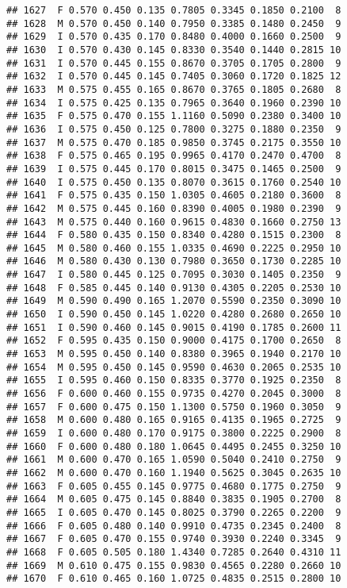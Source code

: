 \documentclass[
]{article}
\begin{document}
\begin{verbatim}
## 1627  F 0.570 0.450 0.135 0.7805 0.3345 0.1850 0.2100  8
## 1628  M 0.570 0.450 0.140 0.7950 0.3385 0.1480 0.2450  9
## 1629  I 0.570 0.435 0.170 0.8480 0.4000 0.1660 0.2500  9
## 1630  I 0.570 0.430 0.145 0.8330 0.3540 0.1440 0.2815 10
## 1631  I 0.570 0.445 0.155 0.8670 0.3705 0.1705 0.2800  9
## 1632  I 0.570 0.445 0.145 0.7405 0.3060 0.1720 0.1825 12
## 1633  M 0.575 0.455 0.165 0.8670 0.3765 0.1805 0.2680  8
## 1634  I 0.575 0.425 0.135 0.7965 0.3640 0.1960 0.2390 10
## 1635  F 0.575 0.470 0.155 1.1160 0.5090 0.2380 0.3400 10
## 1636  I 0.575 0.450 0.125 0.7800 0.3275 0.1880 0.2350  9
## 1637  M 0.575 0.470 0.185 0.9850 0.3745 0.2175 0.3550 10
## 1638  F 0.575 0.465 0.195 0.9965 0.4170 0.2470 0.4700  8
## 1639  I 0.575 0.445 0.170 0.8015 0.3475 0.1465 0.2500  9
## 1640  I 0.575 0.450 0.135 0.8070 0.3615 0.1760 0.2540 10
## 1641  F 0.575 0.435 0.150 1.0305 0.4605 0.2180 0.3600  8
## 1642  M 0.575 0.445 0.160 0.8390 0.4005 0.1980 0.2390  9
## 1643  M 0.575 0.440 0.160 0.9615 0.4830 0.1660 0.2750 13
## 1644  F 0.580 0.435 0.150 0.8340 0.4280 0.1515 0.2300  8
## 1645  M 0.580 0.460 0.155 1.0335 0.4690 0.2225 0.2950 10
## 1646  M 0.580 0.430 0.130 0.7980 0.3650 0.1730 0.2285 10
## 1647  I 0.580 0.445 0.125 0.7095 0.3030 0.1405 0.2350  9
## 1648  F 0.585 0.445 0.140 0.9130 0.4305 0.2205 0.2530 10
## 1649  M 0.590 0.490 0.165 1.2070 0.5590 0.2350 0.3090 10
## 1650  I 0.590 0.450 0.145 1.0220 0.4280 0.2680 0.2650 10
## 1651  I 0.590 0.460 0.145 0.9015 0.4190 0.1785 0.2600 11
## 1652  F 0.595 0.435 0.150 0.9000 0.4175 0.1700 0.2650  8
## 1653  M 0.595 0.450 0.140 0.8380 0.3965 0.1940 0.2170 10
## 1654  M 0.595 0.450 0.145 0.9590 0.4630 0.2065 0.2535 10
## 1655  I 0.595 0.460 0.150 0.8335 0.3770 0.1925 0.2350  8
## 1656  F 0.600 0.460 0.155 0.9735 0.4270 0.2045 0.3000  8
## 1657  F 0.600 0.475 0.150 1.1300 0.5750 0.1960 0.3050  9
## 1658  M 0.600 0.480 0.165 0.9165 0.4135 0.1965 0.2725  9
## 1659  I 0.600 0.480 0.170 0.9175 0.3800 0.2225 0.2900  8
## 1660  F 0.600 0.480 0.180 1.0645 0.4495 0.2455 0.3250 10
## 1661  M 0.600 0.470 0.165 1.0590 0.5040 0.2410 0.2750  9
## 1662  M 0.600 0.470 0.160 1.1940 0.5625 0.3045 0.2635 10
## 1663  F 0.605 0.455 0.145 0.9775 0.4680 0.1775 0.2750  9
## 1664  M 0.605 0.475 0.145 0.8840 0.3835 0.1905 0.2700  8
## 1665  I 0.605 0.470 0.145 0.8025 0.3790 0.2265 0.2200  9
## 1666  F 0.605 0.480 0.140 0.9910 0.4735 0.2345 0.2400  8
## 1667  F 0.605 0.470 0.155 0.9740 0.3930 0.2240 0.3345  9
## 1668  F 0.605 0.505 0.180 1.4340 0.7285 0.2640 0.4310 11
## 1669  M 0.610 0.475 0.155 0.9830 0.4565 0.2280 0.2660 10
## 1670  F 0.610 0.465 0.160 1.0725 0.4835 0.2515 0.2800 10

\end{verbatim}
\end{document}
